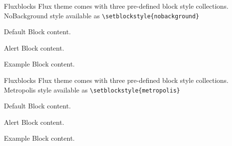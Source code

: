 \documentclass{beamer}
\begin{document}
\begin{frame}[fragile]{Flux}{blocks}
  		Flux theme comes with three pre-defined block style collections.\\
  		NoBackground style available as \verb+\setblockstyle{nobackground}+\\[0.5cm]
  
   \centering
	\begin{minipage}[b]{0.5\textwidth}

	  \begin{block}{Default}
        Block content.
      \end{block}

      \begin{alertblock}{Alert}
        Block content.
      \end{alertblock}

      \begin{exampleblock}{Example}
        Block content.
      \end{exampleblock}       
      
	\end{minipage}
	
\end{frame}

\begin{frame}[fragile]{Flux}{blocks}
  		Flux theme comes with three pre-defined block style collections.\\
  		Metropolis style available as \verb+\setblockstyle{metropolis}+\\[0.5cm]
  
   \centering
	\begin{minipage}[b]{0.5\textwidth}

	  \begin{block}{Default}
        Block content.
      \end{block}

      \begin{alertblock}{Alert}
        Block content.
      \end{alertblock}

      \begin{exampleblock}{Example}
        Block content.
      \end{exampleblock}      
      
	\end{minipage}
	
\end{frame}
\end{document}

